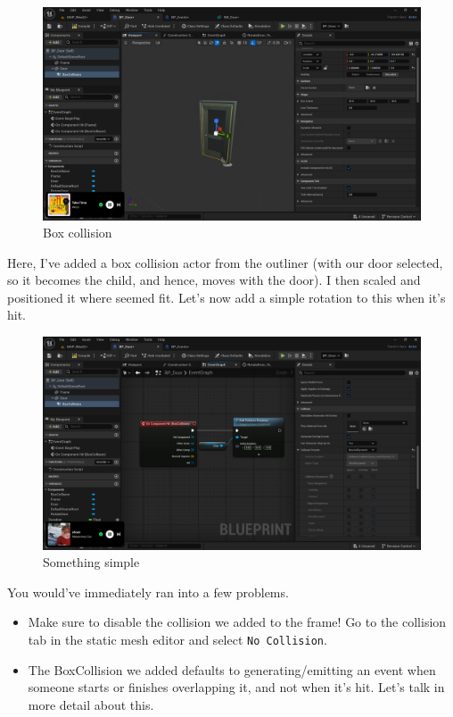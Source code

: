 \documentclass[]{article}
\begin{document}
	\begin{figure}[h]
		\centering
		\includegraphics[width=1\linewidth]{day4images/screenshot008}
		\caption{Box collision}
		\label{fig:screenshot008}
	\end{figure}
	
	Here, I've added a box collision actor from the outliner (with our door selected, so it becomes the child, and hence, moves with the door). I then scaled and positioned it where seemed fit. Let's now add a simple rotation to this when it's hit.
	
	\newpage
	
	\begin{figure}[h]
		\centering
		\includegraphics[width=1\linewidth]{day4images/screenshot009}
		\caption{Something simple}
		\label{fig:screenshot009}
	\end{figure}
	
	You would've immediately ran into a few problems.
	\begin{itemize}
		\item Make sure to disable the collision we added to the frame! Go to the collision tab in the static mesh editor and select \verb|No Collision|.
		\item The BoxCollision we added defaults to generating/emitting an event when someone starts or finishes overlapping it, and not when it's hit. Let's talk in more detail about this.
	\end{itemize}
	
\end{document}
